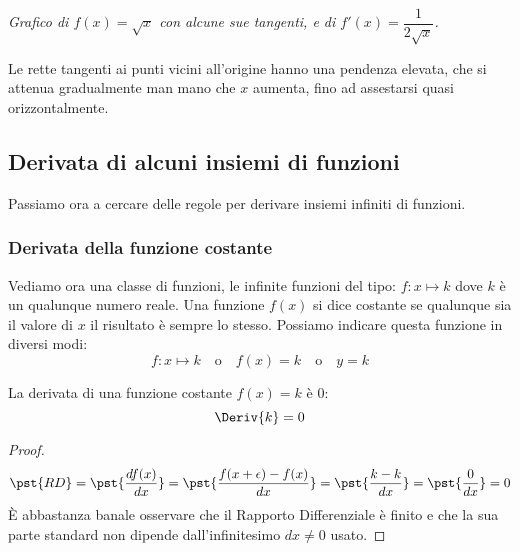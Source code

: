 \begin{inaccessibleblock}
\hspace*{-10mm}
\end{inaccessibleblock}
\label{img:diff_sqrt_con_pendenze}
\begin{center}
\emph{Grafico di \(f(x)=\sqrt{x}\) con alcune sue tangenti, e 
di \(f'(x)= \dfrac{1}{2\sqrt{x}}\).} 
\end{center}

Le rette tangenti ai punti vicini all'origine hanno una pendenza elevata, 
che si attenua gradualmente man mano che \(x\) aumenta, fino ad 
assestarsi quasi orizzontalmente.

\pagebreak %

\subsection{Derivata di alcuni insiemi di funzioni}
\label{subsec:differenziazione_derivatainsiemif}

Passiamo ora a cercare delle regole per derivare insiemi infiniti di funzioni.

\subsubsection{Derivata della funzione costante}
\label{subsec:differenziazione_derivatafcostante}

Vediamo ora una classe di funzioni, le infinite funzioni del tipo: 
\(f: x \mapsto k\) dove \(k\) è un qualunque numero reale.
Una funzione \(f(x)\) si dice costante se qualunque sia il valore di 
\(x\) il risultato è sempre lo stesso. 
Possiamo indicare questa funzione in diversi modi:
\[f: x \mapsto k \quad \text{o} \quad f(x)=k \quad \text{o} \quad y = k\]

\begin{teorema}
La derivata di una funzione costante \(f(x) = k\) \quad è \quad \(0\):
\[\Deriv{k}=0\]
\end{teorema}
\begin{proof}
\[\pst{RD} = \pst{\dfrac{df(x)}{dx}} = 
  \pst{\dfrac{f(x +\epsilon) -f(x)}{dx}} =
  \pst{\dfrac{k-k}{dx}} = \pst{\dfrac{0}{dx}} = 0\]
È abbastanza banale osservare che il Rapporto Differenziale è finito e che la 
sua parte standard non dipende dall'infinitesimo \(dx \ne 0\) usato.
\end{proof}

